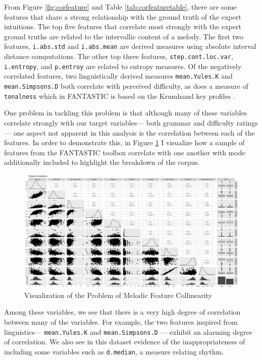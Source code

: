 \documentclass[12pt,]{book}
\begin{document}
From Figure \ref{fig:corfeature} and Table \ref{tab:corfeaturetable}, there are some features that share a strong relationship with the ground truth of the expert intuitions.
The top five features that correlate most strongly with the expert ground truths are related to the intervallic content of a melody.
The first two features, \texttt{i.abs.std} and \texttt{i.abs.mean} are derived measures using absolute interval distance computations.
The other top three features, \texttt{step.cont.loc.var}, \texttt{i.entropy}, and \texttt{p.entroy} are related to entropy measures.
Of the negatively correlated features, two linguistically derived measures \texttt{mean.Yules.K} and \texttt{mean.Simpsons.D} both correlate with perceived difficulty, as does a measure of \texttt{tonalness} which in FANTASTIC is based on the Krumhansl key profiles \citep{krumhanslCognitiveFoundationsMusical2001}.

One problem in tackling this problem is that although many of these variables correlate strongly with our target variables--- both grammar and difficulty ratings--- one aspect not apparent in this analysis is the correlation between each of the features.
In order to demonstrate this, in Figure \ref{fig:featurecorrelations} I visualize how a sample of features from the FANTASTIC toolbox correlate with one another with mode additionally included to highlight the breakdown of the corpus.

\begin{figure}

{\centering \includegraphics[width=1\linewidth]{img/FANTASTIC_collin} 

}

\caption{Visualization of the Problem of Melodic Feature Collinearity}\label{fig:featurecorrelations}
\end{figure}

Among these variables, we see that there is a very high degree of correlation between many of the variables.
For example, the two features inspired from linguistics--- \texttt{mean.Yules.K} and \texttt{mean.Simpsons.D} --- exhibit an alarming degree of correlation.
We also see in this dataset evidence of the inappropriateness of including some variables such as \texttt{d.median}, a measure relating rhythm.
\end{document}
